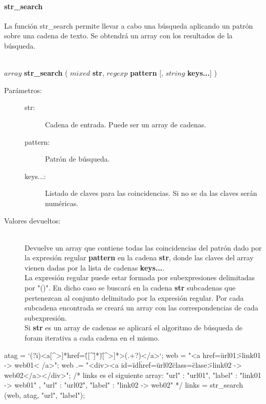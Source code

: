 \paragraph{str\_search}
La función str\_search permite llevar a cabo una búsqueda aplicando un patrón sobre una 
cadena de texto. Se obtendrá un array con los resultados de la búsqueda.

\begin{framed}
\hfill \\ $array$ \textbf{str\_search} ( $mixed$ \textbf{str}, $regexp$ \textbf{pattern} [, $string$ \textbf{keys...}] )  
\begin{description}
\item [Parámetros:] \hfill 
   \begin{description}
   \item[str:] Cadena de entrada. Puede ser un array de cadenas.
   \item[pattern:] Patrón de búsqueda. 
   \item[keys...:] Listado de claves para las coincidencias. Si no se da las
   claves serán numéricas.
   \end{description}
\item[Valores devueltos:] \hfill \\
   Devuelve un array que contiene todas las coincidencias del patrón dado por la 
   expresión regular \textbf{pattern} en la cadena \textbf{str}, donde las 
   claves del array vienen dadas por la lista de cadenas \textbf{keys...}. \\
   
   La expresión regular puede estar formada por subexpresiones delimitadas
   por "()". En dicho caso se buscará en la cadena \textbf{str} subcadenas que pertenezcan al
   conjunto delimitado por la expresión regular. Por cada subcadena encontrada se creará un array
   con las correspondencias de cada subexpresión. \\
   
   Si \textbf{str} es un array de cadenas se aplicará el algoritmo de búsqueda de foram iterativa a cada cadena en el mismo.
\end{description}
\end{framed}

\begin{myverbatim}   
   atag = `(?i)<a[^>]*href\s*=\s*\"([^\"]*)\"[^>]*>(.+?)<\s*/\s*a\s*>`;
   web = "<a href=\"url01\">link01 -> web01< /a>";
   web .= "\n<div><a id=\"id\" href=\"url02\" class=\"clase\">link02 -> web02</a></div>";
   /*
      links es el siguiente array:
      {
         {
            "url" : "url01",
            "label" : "link01 -> web01"
         },
         {
            "url" : "url02",
            "label" : "link02 -> web02"
         }
      }
   */
   links = str_search (web, atag, "url", "label");
\end{myverbatim}

